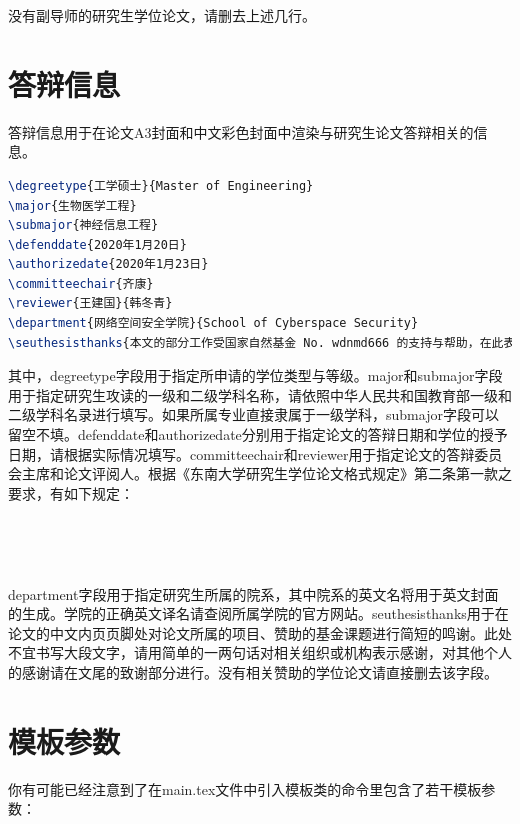 \noindent 没有副导师的研究生学位论文，请删去上述几行。

\section{答辩信息}

答辩信息用于在论文A3封面和中文彩色封面中渲染与研究生论文答辩相关的信息。

\begin{tcolorbox}
\begin{lstlisting}[language=TeX]
\degreetype{工学硕士}{Master of Engineering}
\major{生物医学工程}
\submajor{神经信息工程}
\defenddate{2020年1月20日}
\authorizedate{2020年1月23日}
\committeechair{齐康}
\reviewer{王建国}{韩冬青}
\department{网络空间安全学院}{School of Cyberspace Security}
\seuthesisthanks{本文的部分工作受国家自然基金 No. wdnmd666 的支持与帮助，在此表示感谢。}
\end{lstlisting}
\end{tcolorbox}

其中，{\codefont degreetype}字段用于指定所申请的学位类型与等级。{\codefont major}和{\codefont submajor}字段用于指定研究生攻读的一级和二级学科名称，请依照中华人民共和国教育部一级和二级学科名录进行填写。如果所属专业直接隶属于一级学科，{\codefont submajor}字段可以留空不填。{\codefont defenddate}和{\codefont authorizedate}分别用于指定论文的答辩日期和学位的授予日期，请根据实际情况填写。{\codefont committeechair}和{\codefont reviewer}用于指定论文的答辩委员会主席和论文评阅人。根据《东南大学研究生学位论文格式规定》\cite{seugs2015rule}第二条第一款之要求，有如下规定：

~


~

{\codefont department}字段用于指定研究生所属的院系，其中院系的英文名将用于英文封面的生成。学院的正确英文译名请查阅所属学院的官方网站。{\codefont seuthesisthanks}用于在论文的中文内页页脚处对论文所属的项目、赞助的基金课题进行简短的鸣谢。此处不宜书写大段文字，请用简单的一两句话对相关组织或机构表示感谢，对其他个人的感谢请在文尾的致谢部分进行。没有相关赞助的学位论文请直接删去该字段。

\section{模板参数}

你有可能已经注意到了在main.tex文件中引入模板类的命令里包含了若干模板参数：

